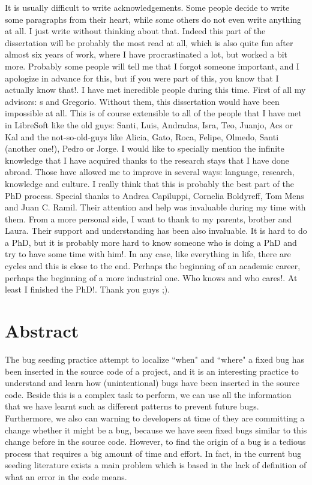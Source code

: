\documentclass[a4paper, 12pt]{book}
\begin{document}
It is usually difficult to write acknowledgements. Some people decide to write some paragraphs from their heart, while some others do not even write anything at all. I just write without thinking about that. Indeed this part of the dissertation will be probably the most read at all, which is also quite fun after almost six years of work, where I have procrastinated a lot, but worked a bit more.
Probably some people will tell me that I forgot someone important, and I apologize in advance for this, but if you were part of this, you know that I actually know that!. I have met incredible people during this time. First of all my advisors: s and Gregorio. Without them, this dissertation would have been impossible at all. This is of course extensible to all of the people that I have met in LibreSoft like the old guys: Santi, Luis, Andradas, Isra, Teo, Juanjo, Acs or Kal and the not-so-old-guys like Alicia, Gato, Roca, Felipe, Olmedo, Santi (another one!), Pedro or Jorge.
I would like to specially mention the infinite knowledge that I have acquired thanks to the research stays that I have done abroad. Those have allowed me to improve in several ways: language, research, knowledge and culture. I really think that this is probably the best part of the PhD process. Special thanks to Andrea Capiluppi, Cornelia Boldyreff, Tom Mens and Juan C.  Ramil. Their attention and help was invaluable during my time with them.
From a more personal side, I want to thank to my parents, brother and Laura. Their support and understanding has been also invaluable. It is hard to do a PhD, but it is probably more hard to know someone who is doing a PhD and try to have some time with him!.
In any case, like everything in life, there are cycles and this is close to the end. Perhaps the beginning of an academic career, perhaps the beginning of a more industrial one. Who knows and who cares!. At least I finished the PhD!.
Thank you guys ;).


\chapter*{Abstract}

The bug seeding practice attempt to localize ``when" and ``where" a fixed bug has been inserted in the source code of a project, and it is an interesting practice to understand and learn how (unintentional) bugs have been inserted in the source code. Beside this is a complex task to perform, we can use all the information that we have learnt such as different patterns to prevent future bugs. Furthermore, we also can warning to developers at time of they are committing a change whether it might be a bug, because we have seen fixed bugs similar to this change before in the source code. However, to find the origin of a bug is a tedious process that requires a big amount of time and effort. In fact, in the current bug seeding literature exists a main problem  which is based in the lack of definition of what an error in the code means.
\end{document}
